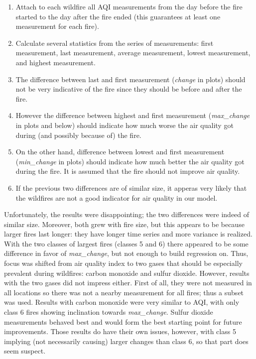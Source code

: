 \documentclass[a4paper,12pt]{article}
\begin{document}
\begin{enumerate}[itemsep=-0.5ex]
	\item Attach to each wildfire all AQI measurements from the day before the fire started to the day after the fire ended (this guarantees at least one measurement for each fire).
	\item Calculate several statistics from the series of measurements: first measurement, last measurement, average measurement, lowest measurement, and highest measurement.
	\item The difference between last and first measurement (\emph{change} in plots) should not be very indicative of the fire since they should be before and after the fire.
	\item However the difference between highest and first measurement (\emph{max\_change} in plots and below) should indicate how much worse the air quality got during (and possibly because of) the fire.
	\item On the other hand, difference between lowest and first measurement (\emph{min\_change} in plots) should indicate how much better the air quality got during the fire. It is assumed that the fire should not improve air quality.
	\item If the previous two differences are of similar size, it apperas very likely that the wildfires are not a good indicator for air quality in our model.
\end{enumerate}

Unfortunately, the results were disappointing; the two differences were indeed of similar size. Moreover, both grew with fire size, but this appears to be because larger fires last longer: they have longer time series and more variance is realized. With the two classes of largest fires (classes 5 and 6) there appeared to be some difference in favor of \emph{max\_change}, but not enough to build regression on. Thus, focus was shifted from air quality index to two gases that should be especially prevalent during wildfires: carbon monoxide and sulfur dioxide. However, results with the two gases did not impress either. First of all, they were not measured in all locations so there was not a nearby measurement for all fires; thus a subset was used. Results with carbon monoxide were very similar to AQI, with only class 6 fires showing inclination towards \emph{max\_change}. Sulfur dioxide measurements behaved best and would form the best starting point for future improvements. Those results do have their own issues, however, with class 5 implying (not necessarily causing) larger changes than class 6, so that part does seem suspect.
\end{document}
